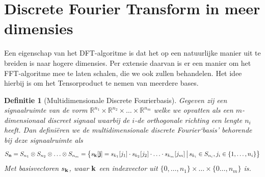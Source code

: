 \documentclass[11pt]{report}
\newcommand{\R}{\mathbb{R}}
\theoremstyle{plain}
\newtheorem*{definitie}{Definitie}
\theoremstyle{remark}
\newcommand{\eq}[1]{\begin{eqnarray*} #1 \end{eqnarray*}}
\newcommand{\largediv}{\,\big|\,}
\begin{document}
\section{Discrete Fourier Transform in meer dimensies}
Een eigenschap van het DFT-algoritme is dat het op een natuurlijke manier uit te breiden is naar hogere dimensies.
Per extensie daarvan is er een manier om het FFT-algoritme mee te laten schalen, die we ook zullen behandelen.
Het idee hierbij is om het Tensorproduct te nemen van meerdere bases.

\begin{definitie}[Multidimensionale Discrete Fourierbasis] 
Gegeven zij een signaalruimte van de vorm
$\R^{n_1} \times \R^{n_2} \times \ldots \times \R^{n_m}$ welke we opvatten als
een $m$-dimensionaal discreet signaal waarbij de $i$-de orthogonale richting een lengte $n_i$ heeft.
Dan defini\"eren we de multidimensionale discrete Fourier`basis' behorende bij deze signaalruimte als
\eq{
  S_{\bold n}= S_{n_1}\otimes S_{n_2} \otimes \ldots \otimes S_{n_m} = 
  \left\{s_{\bold k}[{\bold j}]  = s_{k_1}[j_1]\cdot s_{k_2}[j_2]\cdot\ldots\cdot s_{k_m}[j_m] 
  \largediv s_{k_i} \in S_{n_i}, j_i \in \{1,\ldots, n_i\} \right\}
}
Met basisvectoren $s_{\bold k}$, waar $\bold k$ een indexvector uit $\{0, \ldots, n_1\}\times\ldots\times\{0\ldots, n_m\}$ is.
\end{definitie}
\end{document}
